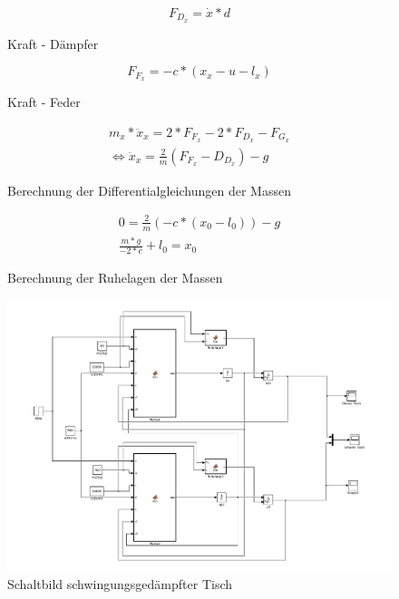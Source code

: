 \documentclass[10pt,a4paper]{article}
\begin{document}
\begin{figure}[H]
\begin{equation}
	F_{D_x} = \dot{x} * d
\end{equation}
\caption{Kraft - Dämpfer}
\end{figure}

\begin{figure}[H]
\begin{equation}
	F_{F_x} = -c * (x_x - u - l_x)
\end{equation}
\caption{Kraft - Feder}
\end{figure}

\begin{figure}[H]
\begin{subequations}
\begin{align}
	m_x * \ddot{x}_x = 2 * F_{F_x} - 2 * F_{D_x} - F_{G_x} \\
	\iff \ddot{x}_x = \frac{2}{m} (F_{F_x} - D_{D_x}) - g
\end{align}
\end{subequations}
\caption{Berechnung der Differentialgleichungen der Massen}
\end{figure}

\begin{figure}[H]
\begin{subequations}
\begin{align}
	0 = \frac{2}{m} (-c * (x_0 - l_0)) - g \\
	\frac{m * g}{-2 * c} + l_0 = x_0
\end{align}
\end{subequations}
\caption{Berechnung der Ruhelagen der Massen}
\end{figure}

\begin{figure}[H]
	\centering
	\includegraphics[width=1\textwidth]{../aufgabe3/screens/tisch}
	\caption{Schaltbild schwingungsgedämpfter Tisch}
  \end{figure}
\end{document}
